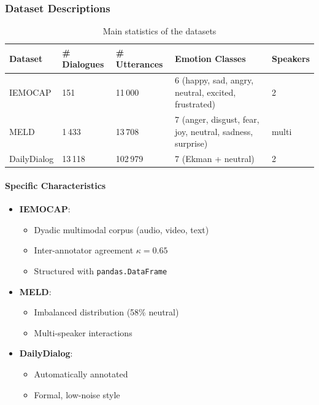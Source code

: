 \documentclass[a4paper,11pt]{article}
\begin{document}
\subsubsection{Dataset Descriptions}

\begin{table}[h]
  \centering
  \begin{tabular}{lllll}
    \toprule
    Dataset & \# Dialogues & \# Utterances & Emotion Classes & Speakers \\
    \midrule
    IEMOCAP & 151 & 11\,000 & 6 (happy, sad, angry, neutral, excited, frustrated) & 2 \\
    MELD & 1\,433 & 13\,708 & 7 (anger, disgust, fear, joy, neutral, sadness, surprise) & multi \\
    DailyDialog & 13\,118 & 102\,979 & 7 (Ekman + neutral) & 2 \\
    \bottomrule
  \end{tabular}
  \caption{Main statistics of the datasets \cite{busso2008iemocap, poria2019meld, li2017dailydialog}}
  \label{tab:dataset_stats}
\end{table}

\paragraph{Specific Characteristics}
\begin{itemize}
  \item \textbf{IEMOCAP}:
    \begin{itemize}
      \item Dyadic multimodal corpus (audio, video, text)
      \item Inter-annotator agreement $\kappa=0.65$
      \item Structured with \texttt{pandas.DataFrame}
    \end{itemize}
  \item \textbf{MELD}:
    \begin{itemize}
      \item Imbalanced distribution (58\% neutral)
      \item Multi-speaker interactions
    \end{itemize}
  \item \textbf{DailyDialog}:
    \begin{itemize}
      \item Automatically annotated
      \item Formal, low-noise style
    \end{itemize}
\end{itemize}
\end{document}
